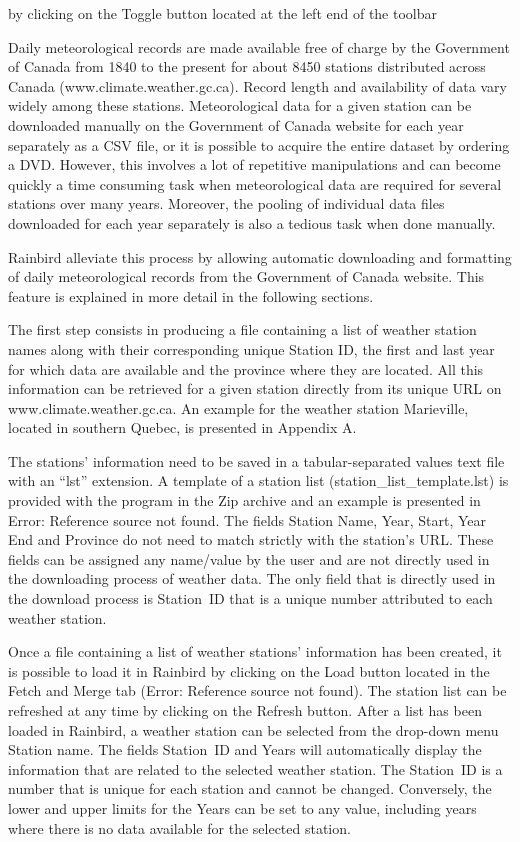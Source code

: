 \documentclass[12pt, letterpaper, fleqn]{report}
\begin{document}
by clicking on the Toggle button located at the left end of the toolbar

Daily meteorological records are made available free of charge by the Government of Canada from 1840 to the present for about 8450 stations distributed across Canada (www.climate.weather.gc.ca). Record length and availability of data vary widely among these stations. Meteorological data for a given station can be downloaded manually on the Government of Canada website for each year separately as a CSV file, or it is possible to acquire the entire dataset by ordering a DVD. However, this involves a lot of repetitive manipulations and can become quickly a time consuming task when meteorological data are required for several stations over many years. Moreover, the pooling of individual data files downloaded for each year separately is also a tedious task when done manually.

Rainbird alleviate this process by allowing automatic downloading and formatting of daily meteorological records from the Government of Canada website. This feature is explained in more detail in the following sections.

The first step consists in producing a file containing a list of weather station names along with their corresponding unique Station ID, the first and last year for which data are available and the province where they are located. All this information can be retrieved for a given station directly from its unique URL on www.climate.weather.gc.ca. An example for the weather station Marieville, located in southern Quebec, is presented in Appendix A.

The stations' information need to be saved in a tabular-separated values text file with an “lst” extension. A template of a station list (station\_list\_template.lst) is provided with the program in the Zip archive and an example is presented in Error: Reference source not found. The fields Station Name, Year, Start, Year End and Province do not need to match strictly with the station's URL. These fields can be assigned any name/value by the user and are not directly used in the downloading process of weather data. The only field that is directly used in the download process is Station ID that is a unique number attributed to each weather station.

Once a file containing a list of weather stations' information has been created, it is possible to load it in Rainbird by clicking on the  Load button located in the Fetch and Merge tab (Error: Reference source not found). The station list can be refreshed at any time by clicking on the  Refresh button. 
After a list has been loaded in Rainbird, a weather station can be selected from the drop-down menu Station name. The fields Station ID and Years will automatically display the information that are related to the selected weather station. The Station ID is a number that is unique for each station and cannot be changed. Conversely, the lower and upper limits for the Years can be set to any value, including years where there is no data available for the selected station. 
\end{document}

